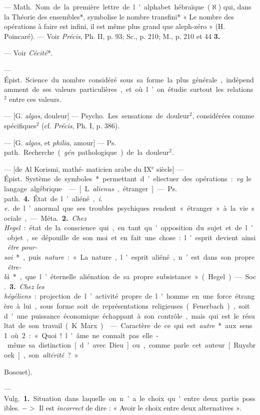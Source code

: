 \begin{itemize}[leftmargin=1cm, label=, itemsep=1pt]
{ — \si{Math.} Nom de la première
lettre de l'alphabet hébraïque ($\aleph$)
qui, dans la Théorie des ensembles*,
symbolise le nombre transfini*
« Le nombre des opérations à faire
est infini, il est même plus grand
que aleph-zéro » (H. Poincaré). —
Voir {\it Précis}, Ph. II, p. 93; Sc., p. 210;
M., p. 210 et 44 {\bf 3.}

 — Voir {\it Cécité}*.

 — \si{Épist.} Science du nombre
considéré sous sa forme la plus générale, indépendamment de ses valeurs
particulières, et où l’on étudie surtout les relations$^2$ entre ces valeurs.

 — [G. {\it algos}, douleur] — \si{Psycho.} Les sensations de
douleur$^2$, considérées comme spécifiques$^2$ (cf. {\it Précis}, Ph. I, p. 386).

 — [G. {\it algos}, et {\it philia}, amour]
— \si{Ps. path.} Recherche ({\it gén}. pathologique) de la douleur$^2$.

 — [de Al Korismi, mathé-
maticien arabe du {\footnotesize IX}$^\text{e}$ siècle] — \si{Épist.}
Système de symboles* permettant
d’eliectuer des opérations : {\it vg}. le
langage algébrique.

 — [L. {\it alienus}, étranger] —
\si{Ps. path.} {\bf 4.} État de l’aliéné, {\it i. e.} de
l’anormal que ses troubles psychiques rendent « étranger » à la
vie sociale,

— \si{Méta.} {\bf 2.} {\it Chez Hegel} : état de la
conscience qui, en tant qu'opposition du sujet et de l’objet,
se dépouille de son moi et en fait une
chose: l'esprit devient ainsi {\it être
pour-soi}*, puis {\it nature} : « La nature,
l'esprit aliéné, n’est dans son propre
{\it être-là}*, que l’éternelle aliénation de
sa propre subsistance » (Hegel).

— \si{Soc.} {\bf 3.} {\it Chez les hégéliens} : projection de l’activité propre de l'homme
en une force étrangère à lui, sous
forme soit de représentations religieuses (Feuerbach), soit d'une
puissance économique échappant à
son contrôle, mais qui est le résultat
de son travail (K. Marx).

 — Caractère de ce qui est
{\it autre}* aux sens 1 où 2 : « Quoi!
l'âme ne connaît pas elle-même sa
distinction [d'avec Dieu] ou, comme
parle cet auteur [Ruysbroek], son
{\it altérité} ? » {Bossuet).

 — \si{Vulg.} {\bf 1.} Situation
dans laquelle on n’a le choix qu'entre
deux partis possibles. $->$ Il est
{\it incorrect} de dire : « Avoir le choix
entre deux alternatives ».

}}
\end{itemize}
